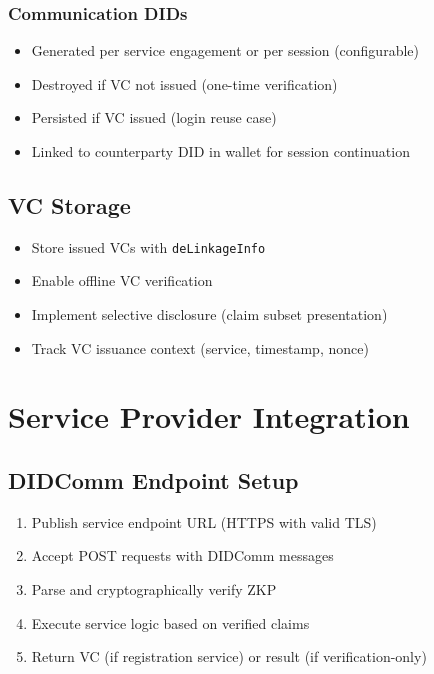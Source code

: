 \subsubsection{Communication DIDs}

\begin{itemize}
  \item Generated per service engagement or per session (configurable)
  \item Destroyed if VC not issued (one-time verification)
  \item Persisted if VC issued (login reuse case)
  \item Linked to counterparty DID in wallet for session continuation
\end{itemize}

\subsection{VC Storage}

\begin{itemize}
  \item Store issued VCs with \texttt{deLinkageInfo}
  \item Enable offline VC verification
  \item Implement selective disclosure (claim subset presentation)
  \item Track VC issuance context (service, timestamp, nonce)
\end{itemize}

\section{Service Provider Integration}

\subsection{DIDComm Endpoint Setup}

\begin{enumerate}
  \item Publish service endpoint URL (HTTPS with valid TLS)
  \item Accept POST requests with DIDComm messages
  \item Parse and cryptographically verify ZKP
  \item Execute service logic based on verified claims
  \item Return VC (if registration service) or result (if verification-only)
\end{enumerate}

